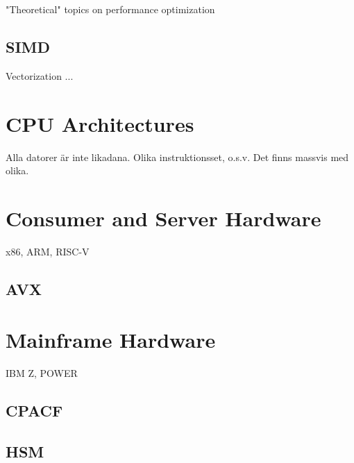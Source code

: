 "Theoretical" topics on performance optimization

\subsection{SIMD}

Vectorization ...

\section{CPU Architectures}

Alla datorer är inte likadana. Olika instruktionsset, o.s.v. Det finns massvis med olika.

\section{Consumer and Server Hardware}

x86, ARM, RISC-V

\subsection{AVX}

\section{Mainframe Hardware}

IBM Z, POWER

\subsection{CPACF}

\subsection{HSM}
